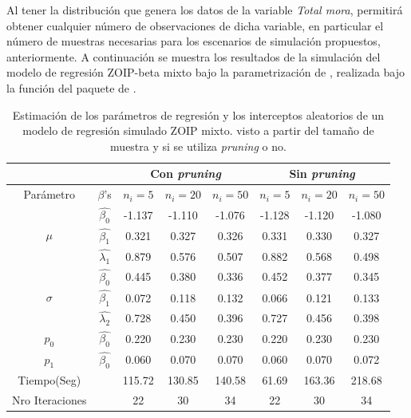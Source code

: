 Al tener la distribuci\'{o}n que genera los datos de la variable \textsl{Total mora}, permitir\'{a} obtener cualquier n\'{u}mero de observaciones de dicha variable, en particular el n\'{u}mero de muestras necesarias para los escenarios de simulaci\'{o}n propuestos, anteriormente. A continuaci\'{o}n se muestra los resultados de la simulaci\'{o}n del modelo de regresi\'{o}n ZOIP-beta mixto bajo la parametrizaci\'{o}n de \cite{Stasinopoulos2}, realizada bajo la funci\'{o}n  del paquete  de .\\

\begin{table}[!hbt]
{\scriptsize
\begin{center}
\begin{tabular}{|c|c|c|c|c|c|c|c|}\hline
& & \multicolumn{3}{|c|}{Con \textit{pruning}} & \multicolumn{3}{|c|}{Sin \textit{pruning}} \\ \hline
Par\'{a}metro & $\beta$'s & $n_i=5$ & $n_i=20$ & $n_i=50$ & $n_i=5$ & $n_i=20$ & $n_i=50$ \\ \hline \hline
\multirow{3}{*}{$\mu$} & $\hat{\beta_0}$ & -1.137	&-1.110	&-1.076	&-1.128	&-1.120	&-1.080 \\ 
& $\hat{\beta_1}$ & 0.321	&0.327	&0.326	&0.331	&0.330	&0.327 \\
& $\hat{\lambda_1}$ & 0.879	&0.576	&0.507	&0.882	&0.568	&0.498 \\ \hline
\multirow{3}{*}{$\sigma$} & $\hat{\beta_0}$ & 0.445	&0.380	&0.336	&0.452	&0.377	&0.345 \\ 
& $\hat{\beta_1}$ & 0.072	&0.118	&0.132	&0.066	&0.121	&0.133\\
& $\hat{\lambda_2}$ & 0.728	&0.450	&0.396	&0.727	&0.456	&0.398\\ \hline
$p_0$& $\hat{\beta_0}$ &0.220	&0.230	&0.230	&0.220	&0.230	&0.230 \\ \hline
$p_1$& $\hat{\beta_0}$ &0.060	&0.070	&0.070	&0.060	&0.070	&0.072 \\ \hline
Tiempo(Seg)& &115.72	&130.85	&140.58	&61.69	&163.36	&218.68 \\ \hline
Nro Iteraciones& &22	&30	&34	&22	&30	&34 \\ \hline
\end{tabular}
\caption{Estimaci\'{o}n de los par\'{a}metros de regresi\'{o}n y los interceptos aleatorios de un modelo de regresi\'{o}n simulado ZOIP mixto. visto a partir del tama\~{n}o de muestra y si se utiliza \textit{pruning} o no.}
\label{T_Sim_mix_ni}
\end{center}
}
\end{table}

